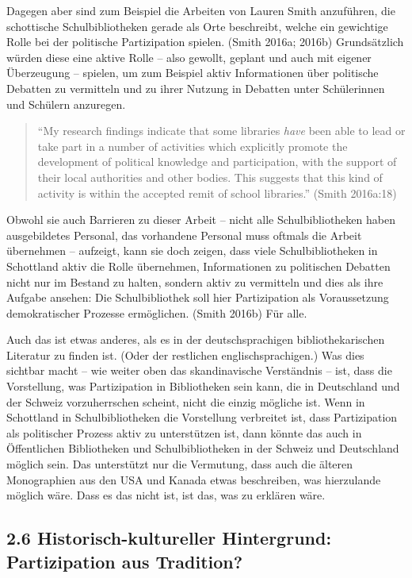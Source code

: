 \documentclass[a4paper,
fontsize=11pt,
oneside,
numbers=noperiodatend,
parskip=half-,
bibliography=totoc,
final
]{scrartcl}
\begin{document}
Dagegen aber sind zum Beispiel die Arbeiten von Lauren Smith anzuführen,
die schottische Schulbibliotheken gerade als Orte beschreibt, welche ein
gewichtige Rolle bei der politische Partizipation spielen. (Smith 2016a;
2016b) Grundsätzlich würden diese eine aktive Rolle -- also gewollt,
geplant und auch mit eigener Überzeugung -- spielen, um zum Beispiel
aktiv Informationen über politische Debatten zu vermitteln und zu ihrer
Nutzung in Debatten unter Schülerinnen und Schülern anzuregen.

\begin{quote}
\enquote{My research findings indicate that some libraries \emph{have}
been able to lead or take part in a number of activities which
explicitly promote the development of political knowledge and
participation, with the support of their local authorities and other
bodies. This suggests that this kind of activity is within the accepted
remit of school libraries.} (Smith 2016a:18)
\end{quote}

Obwohl sie auch Barrieren zu dieser Arbeit -- nicht alle
Schulbibliotheken haben ausgebildetes Personal, das vorhandene Personal
muss oftmals die Arbeit übernehmen -- aufzeigt, kann sie doch zeigen,
dass viele Schulbibliotheken in Schottland aktiv die Rolle übernehmen,
Informationen zu politischen Debatten nicht nur im Bestand zu halten,
sondern aktiv zu vermitteln und dies als ihre Aufgabe ansehen: Die
Schulbibliothek soll hier Partizipation als Voraussetzung demokratischer
Prozesse ermöglichen. (Smith 2016b) Für alle.

Auch das ist etwas anderes, als es in der deutschsprachigen
bibliothekarischen Literatur zu finden ist. (Oder der restlichen
englischsprachigen.) Was dies sichtbar macht -- wie weiter oben das
skandinavische Verständnis -- ist, dass die Vorstellung, was
Partizipation in Bibliotheken sein kann, die in Deutschland und der
Schweiz vorzuherrschen scheint, nicht die einzig mögliche ist. Wenn in
Schottland in Schulbibliotheken die Vorstellung verbreitet ist, dass
Partizipation als politischer Prozess aktiv zu unterstützen ist, dann
könnte das auch in Öffentlichen Bibliotheken und Schulbibliotheken in
der Schweiz und Deutschland möglich sein. Das unterstützt nur die
Vermutung, dass auch die älteren Monographien aus den USA und Kanada
etwas beschreiben, was hierzulande möglich wäre. Dass es das nicht ist,
ist das, was zu erklären wäre.

\hypertarget{historisch-kultureller-hintergrund-partizipation-aus-tradition}{%
\subsection{2.6 Historisch-kultureller Hintergrund: Partizipation aus
Tradition?}\label{historisch-kultureller-hintergrund-partizipation-aus-tradition}}
\end{document}

